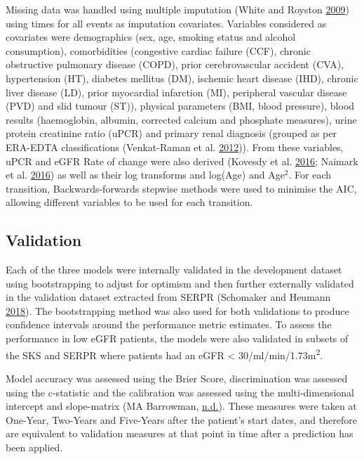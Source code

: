 \documentclass[
]{article}
\begin{document}
Missing data was handled using multiple imputation (White and Royston \protect\hyperlink{ref-white_imputing_2009}{2009}) using times for all events as imputation covariates. Variables considered as covariates were demographics (sex, age, smoking status and alcohol consumption), comorbidities (congestive cardiac failure (CCF), chronic obstructive pulmonary disease (COPD), prior cerebrovascular accident (CVA), hypertension (HT), diabetes mellitus (DM), ischemic heart disease (IHD), chronic liver disease (LD), prior myocardial infarction (MI), peripheral vascular disease (PVD) and slid tumour (ST)), physical parameters (BMI, blood pressure), blood results (haemoglobin, albumin, corrected calcium and phosphate measures), urine protein creatinine ratio (uPCR) and primary renal diagnosis (grouped as per ERA-EDTA classifications (Venkat-Raman et al. \protect\hyperlink{ref-venkat-raman_new_2012}{2012})). From these variables, uPCR and eGFR Rate of change were also derived (Kovesdy et al. \protect\hyperlink{ref-kovesdy_past_2016}{2016}; Naimark et al. \protect\hyperlink{ref-naimark_past_2016}{2016}) as well as their log transforms and log(Age) and Age\(^2\). For each transition, Backwards-forwards stepwise methods were used to minimise the AIC, allowing different variables to be used for each transition.

\hypertarget{validation}{%
\subsection{Validation}\label{validation}}

Each of the three models were internally validated in the development dataset using bootstrapping to adjust for optimism and then further externally validated in the validation dataset extracted from SERPR (Schomaker and Heumann \protect\hyperlink{ref-schomaker_bootstrap_2018}{2018}). The bootstrapping method was also used for both validations to produce confidence intervals around the performance metric estimates. To assess the performance in low eGFR patients, the models were also validated in subsets of the SKS and SERPR where patients had an eGFR \textless{} 30/ml/min/1.73m\textsuperscript{2}.

Model accuracy was assessed using the Brier Score, discrimination was assessed using the c-statistic and the calibration was assessed using the multi-dimensional intercept and slope-matrix (MA Barrowman, \protect\hyperlink{ref-chap-performance-metrics}{n.d.}). These measures were taken at One-Year, Two-Years and Five-Years after the patient's start dates, and therefore are equivalent to validation measures at that point in time after a prediction has been applied.
\end{document}
